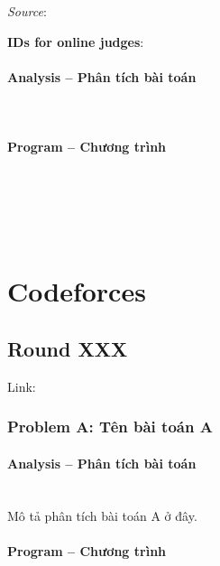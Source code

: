 \documentclass{article}
\begin{document}
\textit{Source}: 

\textbf{IDs for online judges}:

\paragraph{Analysis -- Phân tích bài toán} \mbox{} \\



\paragraph{Program -- Chương trình} \mbox{} \\


\begin{lstlisting}
	
	
\end{lstlisting}


\section{Codeforces}

\subsection{Round XXX}

Link: \url{}

\subsubsection{Problem A: Tên bài toán A}

\paragraph{Analysis -- Phân tích bài toán} \mbox{} \\

Mô tả phân tích bài toán A ở đây.

\paragraph{Program -- Chương trình} \mbox{} \\

\begin{lstlisting}

\end{lstlisting}
\end{document}
